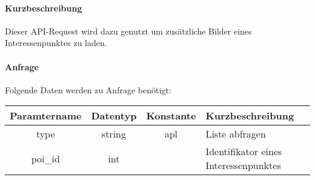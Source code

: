 \paragraph{Kurzbeschreibung}Dieser API-Request wird dazu genutzt um zusätzliche Bilder eines Interessenpunktes zu laden.
\paragraph{Anfrage}Folgende Daten werden zu Anfrage benötigt:
\begin{table}[H]
	\begin{tabular}{|c|c|c|p{6.5cm}|}
		\hline
		\textbf{Paramtername} & \textbf{Datentyp} & \textbf{Konstante} & \textbf{Kurzbeschreibung}                                                                                               \\ \hline
		type                & string            & apl                & Liste abfragen \\ \hline
		poi\_id             & int               &                    & Identifikator eines Interessenpunktes \\ \hline
	\end{tabular}
\end{table}
